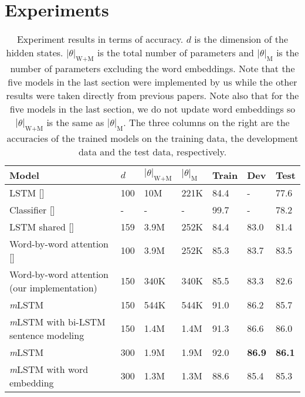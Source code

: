 \documentclass[11pt,letterpaper]{article}
\begin{document}
 \section{Experiments}

\begin{table*}[t]
	\centering
	\small
	\begin{tabular}{lllllll}
		\toprule
		Model                  & $d$   & $|\theta|_{\text{W+M}}$ & $|\theta|_{\text{M}}$ & Train & Dev  & Test \\ 
		\midrule
		LSTM [\newcite{bowman:emnlp15}]                  & 100 & 10M            & 221K         & 84.4  & -    & 77.6 \\
		Classifier [\newcite{bowman:emnlp15}]             & -   & -              & -            & 99.7  & -    & 78.2 \\ 
		\midrule
		LSTM shared [\newcite{rocktaschel:iclr16}]           & 159 & 3.9M           & 252K         & 84.4  & 83.0 & 81.4 \\
		Word-by-word attention [\newcite{rocktaschel:iclr16}] & 100 & 3.9M           & 252K         & 85.3  & 83.7 & 83.5 \\ \midrule
		Word-by-word attention (our implementation)  & 150 & 340K           & 340K         & 85.5  & 83.3 & 82.6 \\ 
		\emph{m}LSTM     & 150 &         544K       &     544K        & 91.0    & 86.2 & 85.7 \\
		\emph{m}LSTM with bi-LSTM sentence modeling     & 150 &         1.4M       &     1.4M        & 91.3    & 86.6 & 86.0 \\ 
		\emph{m}LSTM     & 300 &         1.9M       &     1.9M        & 92.0    & \textbf{86.9} & \textbf{86.1} \\
		\emph{m}LSTM with word embedding     & 300 &        1.3M        &            1.3M &  88.6   & 85.4 & 85.3 \\
		\bottomrule
	\end{tabular}
	\normalsize
	\caption{Experiment results in terms of accuracy.
		$d$ is the dimension of the hidden states.
		$|\theta|_{\text{W+M}}$ is the total number of parameters and $|\theta|_{\text{M}}$ is the number of parameters excluding the word embeddings.
		Note that the five models in the last section were implemented by us while the other results were taken directly from previous papers.
		Note also that for the five models in the last section, we do not update word embeddings so $|\theta|_{\text{W+M}}$  is the same as $|\theta|_{\text{M}}$.
		The three columns on the right are the accuracies of the trained models on the training data, the development data and the test data, respectively.} 
	\label{tab:results}
\end{table*}
\end{document}
